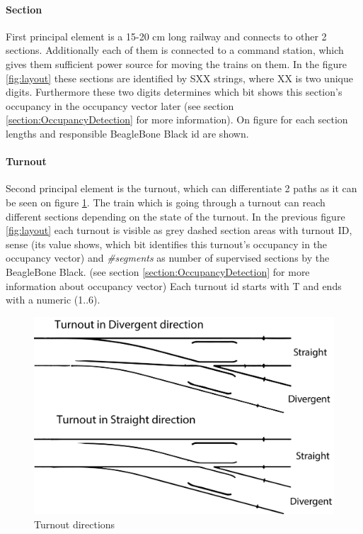 \paragraph{Section} 
First principal  element is a 15-20 cm long railway and connects to other 2 sections. Additionally each of them is connected to a command station, which gives them sufficient power source for moving the trains on them. In the figure \ref{fig:layout} these sections are identified by SXX strings, where XX is two unique digits. Furthermore these two digits determines which bit shows this section's occupancy in the occupancy vector later (see section \ref{section:OccupancyDetection} for more information). On figure for each section lengths and responsible BeagleBone Black id are shown.

\paragraph{Turnout}
Second principal element is the turnout, which can differentiate 2 paths as it can be seen on figure \ref{fig:turnoutDir}. The train which is going through a turnout can reach different sections depending on the state of the turnout. In the previous figure \ref{fig:layout} each turnout is visible as grey dashed section areas with turnout ID, sense (its value shows, which bit identifies this turnout's occupancy in the occupancy vector) and \textit{\#segments} as number of supervised sections by the BeagleBone Black. (see section \ref{section:OccupancyDetection} for more information about occupancy vector) Each turnout id starts with T and ends with a numeric (1..6). 
\begin{figure}[!h]
	\centering
	\includegraphics[width=150mm]{figures/modes3/turnout.png}
	\caption{Turnout directions}
	\label{fig:turnoutDir}
\end{figure}

